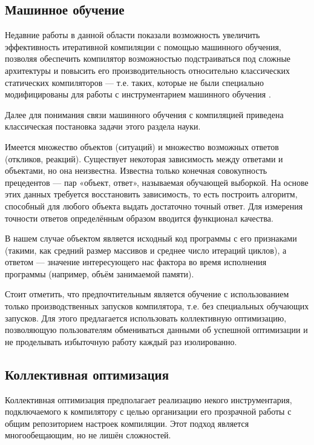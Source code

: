 \subsection{Машинное обучение}
Недавние работы в данной области показали возможность увеличить эффективность итеративной компиляции с помощью машинного обучения, позволяя обеспечить компилятор возможностью подстраиваться под сложные архитектуры и повысить его производительность относительно классических статических компиляторов --- т.е. таких, которые не были специально модифицированы для работы с инструментарием машинного обучения \cite{Dubach:2009:PCO:1669112.1669124,Dubach:2008:EPA:1450095.1450103}.

Далее для понимания связи машинного обучения с компиляцией приведена классическая постановка задачи этого раздела науки.

Имеется множество объектов (ситуаций) и множество возможных ответов (откликов, реакций). Существует некоторая зависимость между ответами и объектами, но она неизвестна. Известна только конечная совокупность прецедентов — пар «объект, ответ», называемая обучающей выборкой. На основе этих данных требуется восстановить зависимость, то есть построить алгоритм, способный для любого объекта выдать достаточно точный ответ. Для измерения точности ответов определённым образом вводится функционал качества.

В нашем случае объектом является исходный код программы с его признаками (такими, как средний размер массивов и среднее число итераций циклов), а ответом --- значение интересующего нас фактора во время исполнения программы (например, объём занимаемой памяти).

Стоит отметить, что предпочтительным является обучение с использованием только производственных запусков компилятора, т.е. без специальных обучающих запусков. Для этого предлагается использовать коллективную оптимизацию, позволяющую пользователям обмениваться данными об успешной оптимизации и не проделывать избыточную работу каждый раз изолированно.

\subsection{Коллективная оптимизация}
Коллективная оптимизация предполагает реализацию некого инструментария, подключаемого к компилятору с целью организации его прозрачной работы с общим репозиторием настроек компиляции. Этот подход является многообещающим, но не лишён сложностей.

